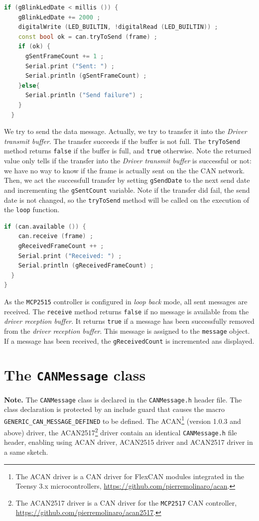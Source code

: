 \documentclass[9pt, a4paper, obeyspaces]{extarticle}
\newcommand \sectionLabel[2]{\section{#1}\label{sec:#2}}
\begin{document}
{ \small\begin{lstlisting}[language=c++]
  if (gBlinkLedDate < millis ()) {
    gBlinkLedDate += 2000 ;
    digitalWrite (LED_BUILTIN, !digitalRead (LED_BUILTIN)) ;
    const bool ok = can.tryToSend (frame) ;
    if (ok) {
      gSentFrameCount += 1 ;
      Serial.print ("Sent: ") ;
      Serial.println (gSentFrameCount) ;
    }else{
      Serial.println ("Send failure") ;
    }
  }
\end{lstlisting}}
We try to send the data message. Actually, we try to transfer it into the \emph{Driver transmit buffer}. The transfer succeeds if the buffer is not full. The \texttt{tryToSend} method returns \texttt{false} if the buffer is full, and \texttt{true} otherwise. Note the returned value only tells if the transfer into the \emph{Driver transmit buffer} is successful or not: we have no way to know if the frame is actually sent on the the CAN network. Then, we act the successfull transfer by setting \texttt{gSendDate} to the next send date and incrementing the \texttt{gSentCount} variable. Note if the transfer did fail, the send date is not changed, so the \texttt{tryToSend} method will be called on the execution of the \texttt{loop} function.


{ \small\begin{lstlisting}[language=c++]
  if (can.available ()) {
    can.receive (frame) ;
    gReceivedFrameCount ++ ;
    Serial.print ("Received: ") ;
    Serial.println (gReceivedFrameCount) ;
  }
}
\end{lstlisting}}
As the \texttt{MCP2515} controller is configured in \emph{loop back} mode, all sent messages are received. The \texttt{receive} method returns \texttt{false} if no message is available from the \emph{driver reception buffer}. It returns \texttt{true} if a message has been successfully removed from the \emph{driver reception buffer}. This message is assigned to the \texttt{message} object. If a message has been received, the \texttt{gReceivedCount} is incremented ans displayed.





\sectionLabel{The \texttt{CANMessage} class}{CANMessageClass}

{\bf Note. } The \texttt{CANMessage} class is declared in the \texttt{CANMessage.h} header file. The class declaration is protected by an include guard that causes the macro \texttt{GENERIC\_CAN\_MESSAGE\_DEFINED} to be defined. The ACAN\footnote{The ACAN driver is a CAN driver for FlexCAN modules integrated in the Teensy 3.x microcontrollers, \url{https://github.com/pierremolinaro/acan}.} (version 1.0.3 and above) driver, the ACAN2517\footnote{The ACAN2517 driver is a CAN driver for the \texttt{MCP2517} CAN controller, \url{https://github.com/pierremolinaro/acan2517}.} driver contain an identical \texttt{CANMessage.h} file header, enabling using ACAN driver, ACAN2515 driver and ACAN2517 driver in a same sketch.
\end{document}
